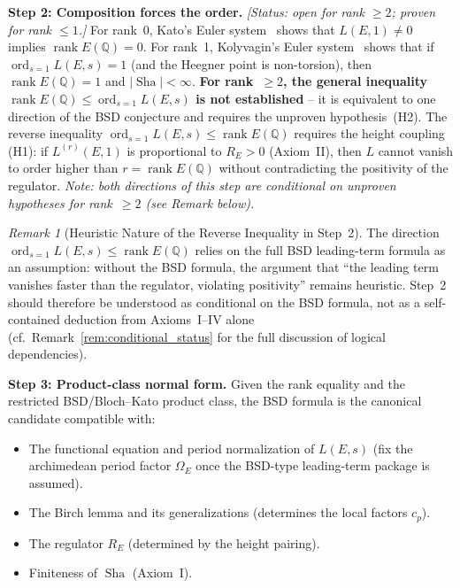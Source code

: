 \documentclass[aps,prd,twocolumn,superscriptaddress,nofootinbib,floatfix]{revtex4-2}
\theoremstyle{definition}
\theoremstyle{remark}
\newtheorem{remark}[theorem]{Remark}
\DeclareMathOperator{\ord}{ord}
\DeclareMathOperator{\rank}{rank}
\DeclareMathOperator{\Sha}{Sha}
\begin{document}
\textbf{Step 2: Composition forces the order.} \textit{[Status: open for rank $\geq 2$; proven for rank $\leq 1$.]} For rank~0, Kato's Euler system~\cite{Kato2004} shows that $L(E,1) \neq 0$ implies $\rank E(\mathbb{Q}) = 0$. For rank~1, Kolyvagin's Euler system~\cite{Kolyvagin1990} shows that if $\ord_{s=1} L(E,s) = 1$ (and the Heegner point is non-torsion), then $\rank E(\mathbb{Q}) = 1$ and $|\Sha| < \infty$. \textbf{For rank~$\geq 2$, the general inequality $\rank E(\mathbb{Q}) \leq \ord_{s=1} L(E,s)$ is not established} -- it is equivalent to one direction of the BSD conjecture and requires the unproven hypothesis~(H2). The reverse inequality $\ord_{s=1} L(E,s) \leq \rank E(\mathbb{Q})$ requires the height coupling (H1): if $L^{(r)}(E,1)$ is proportional to $R_E > 0$ (Axiom~II), then $L$ cannot vanish to order higher than $r = \rank E(\mathbb{Q})$ without contradicting the positivity of the regulator. \textit{Note: both directions of this step are conditional on unproven hypotheses for rank~$\geq 2$ (see Remark below).}

\begin{remark}[Heuristic Nature of the Reverse Inequality in Step~2]
The direction $\ord_{s=1} L(E,s) \leq \rank E(\mathbb{Q})$ relies on the full BSD leading-term formula as an assumption: without the BSD formula, the argument that ``the leading term vanishes faster than the regulator, violating positivity'' remains heuristic. Step~2 should therefore be understood as conditional on the BSD formula, not as a self-contained deduction from Axioms~I--IV alone (cf.\ Remark~\ref{rem:conditional_status} for the full discussion of logical dependencies).
\end{remark}

\textbf{Step 3: Product-class normal form.} Given the rank equality and the restricted BSD/Bloch--Kato product class, the BSD formula is the canonical candidate compatible with:
\begin{itemize}
\item The functional equation and period normalization of $L(E,s)$ (fix the archimedean period factor $\Omega_E$ once the BSD-type leading-term package is assumed).
\item The Birch lemma and its generalizations (determines the local factors $c_p$).
\item The regulator $R_E$ (determined by the height pairing).
\item Finiteness of $\Sha$ (Axiom~I).
\end{itemize}
\end{document}
